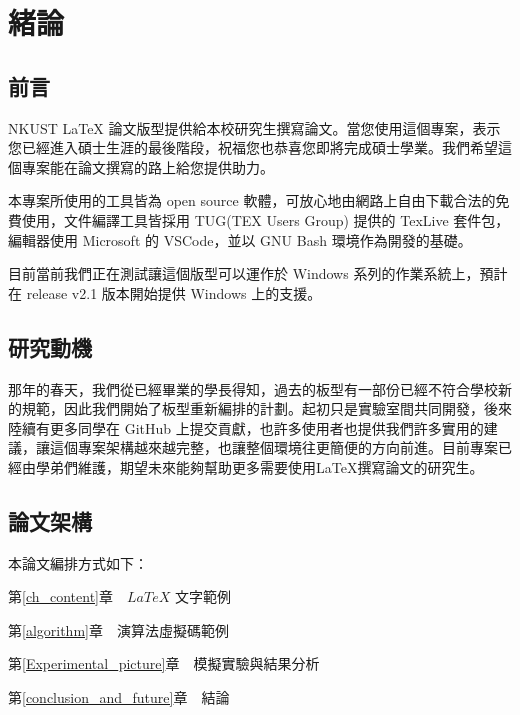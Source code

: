 
\chapter{緒論}\label{introduction}


\section{前言}\label{preface}

NKUST LaTeX 論文版型提供給本校研究生撰寫論文。當您使用這個專案，表示您已經進入碩士生涯的最後階段，祝福您也恭喜您即將完成碩士學業。我們希望這個專案能在論文撰寫的路上給您提供助力。

本專案所使用的工具皆為 open source 軟體，可放心地由網路上自由下載合法的免費使用，文件編譯工具皆採用 TUG(TEX Users Group) 提供的 TexLive 套件包，編輯器使用 Microsoft 的 VSCode，並以 GNU Bash 環境作為開發的基礎。

目前當前我們正在測試讓這個版型可以運作於 Windows 系列的作業系統上，預計在 release v2.1 版本開始提供 Windows 上的支援。

\newpage

\section{研究動機}\label{motive}

那年的春天，我們從已經畢業的學長得知，過去的板型有一部份已經不符合學校新的規範，因此我們開始了板型重新編排的計劃。起初只是實驗室間共同開發，後來陸續有更多同學在 GitHub 上提交貢獻，也許多使用者也提供我們許多實用的建議，讓這個專案架構越來越完整，也讓整個環境往更簡便的方向前進。目前專案已經由學弟們維護，期望未來能夠幫助更多需要使用LaTeX撰寫論文的研究生。


\newpage

\section{論文架構}\label{thesis_arch}
\n 本論文編排方式如下：

第\ref{ch_content}章　$LaTeX$ 文字範例

第\ref{algorithm}章　演算法虛擬碼範例

第\ref{Experimental_picture}章　模擬實驗與結果分析

第\ref{conclusion_and_future}章　結論
